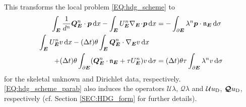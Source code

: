 \documentclass[a4paper, english, 12pt, reqno, draft]{amsart}
\theoremstyle{definition}
\theoremstyle{remark}
\numberwithin{equation}{section}
\newcommand{\Edge}{{\ensuremath{\boldsymbol E}}}
\newcommand{\Nabla}{\ensuremath{\nabla_\Edge}}
\newcommand{\Div}{\ensuremath{\Nabla\!\cdot\!}}
\newcommand{\Normal}{\ensuremath{\mathfrak n_\Edge}}
\renewcommand{\vec}[1]{\ensuremath{\boldsymbol{#1}}}
\newcommand{\dx}{\ensuremath{\, \textup d x}}
\newcommand{\ds}{\ensuremath{\, \textup d \sigma}}
\newcommand{\localU}{\ensuremath{\mathcal U}}
\newcommand{\localQ}{\ensuremath{\vec{\mathcal Q}}}
\newcommand{\deltat}{\ensuremath{(\Delta t)}}
\begin{document}
This transforms the local problem \eqref{EQ:hdg_scheme} to
% 
\begin{subequations}\label{EQ:hdg_scheme_parab}
 \begin{align}
  \int_\Edge \frac{1}{d^n} \vec Q^n_\Edge \cdot \vec p \dx - \int_\Edge U^n_\Edge \Div \vec p \dx & = - \int_{\partial \Edge} \lambda^n \vec p \cdot \Normal \ds \label{EQ:hdg_primary_parab}\\
  \int_\Edge U_\Edge^n v \dx - \deltat \theta \int_\Edge \vec Q^n_\Edge \cdot \Nabla v \dx \quad \notag\\
  + \deltat \theta \int_{\partial \Edge} ( \vec Q^n_\Edge \cdot \Normal + \tau  U^n_\Edge ) v \ds
  & = \deltat \theta \tau \int_{\partial \Edge} \lambda^n v \ds \label{EQ:hdg_flux_parab}
 \end{align}
\end{subequations}
% 
for the skeletal unknown and Dirichlet data, respectively. \eqref{EQ:hdg_scheme_parab} also induces the operators $\localU \lambda$, $\localQ \lambda$ and $\localU u_\textup D$, $\localQ u_\textup D$, respectively (cf. Section \ref{SEC:HDG_form} for further details).
\end{document}
